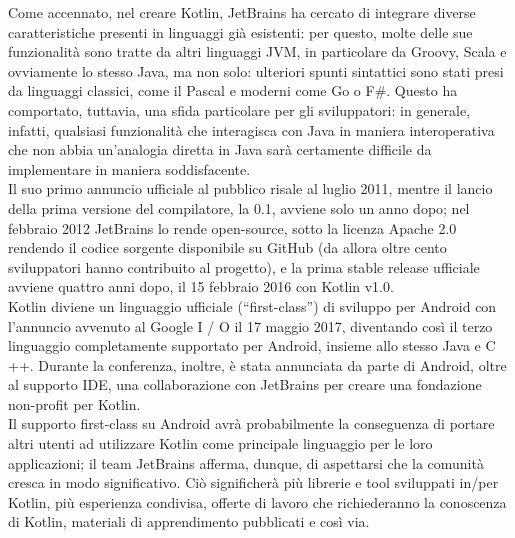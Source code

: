 Come accennato, nel creare Kotlin, JetBrains ha cercato di integrare diverse caratteristiche presenti in linguaggi già esistenti: per questo, molte delle sue funzionalità sono tratte da altri linguaggi JVM, in particolare da Groovy, Scala e ovviamente lo stesso Java, ma non solo: ulteriori spunti sintattici sono stati presi da linguaggi classici, come il Pascal e moderni come Go o F\#. Questo ha comportato, tuttavia, una sfida particolare per gli sviluppatori: in generale, infatti, qualsiasi funzionalità che interagisca con Java in maniera interoperativa che non abbia un'analogia diretta in Java sarà certamente difficile da implementare in maniera soddisfacente.\\

Il suo primo annuncio ufficiale al pubblico risale al luglio 2011, mentre il lancio della prima versione del compilatore, la 0.1, avviene solo un anno dopo; nel febbraio 2012 JetBrains lo rende open-source, sotto la licenza Apache 2.0 rendendo il codice sorgente disponibile su GitHub (da allora oltre cento sviluppatori hanno contribuito al progetto), e la prima stable release ufficiale avviene quattro anni dopo, il 15 febbraio 2016 con Kotlin v1.0.\\
Kotlin diviene un linguaggio ufficiale (“first-class”) di sviluppo per Android con l’annuncio avvenuto al Google I / O il 17 maggio 2017, diventando così il terzo linguaggio completamente supportato per Android, insieme allo stesso Java e C ++. Durante la conferenza, inoltre, è stata annunciata da parte di Android, oltre al supporto IDE, una collaborazione con JetBrains per creare una fondazione non-profit per Kotlin. \\
Il supporto first-class su Android avrà probabilmente la conseguenza di portare altri utenti ad utilizzare Kotlin come principale linguaggio per le loro applicazioni; il team JetBrains afferma, dunque, di aspettarsi che la comunità cresca in modo significativo. Ciò significherà più librerie e tool sviluppati in/per Kotlin, più esperienza condivisa, offerte di lavoro che richiederanno la conoscenza di Kotlin, materiali di apprendimento pubblicati e così via.\\

